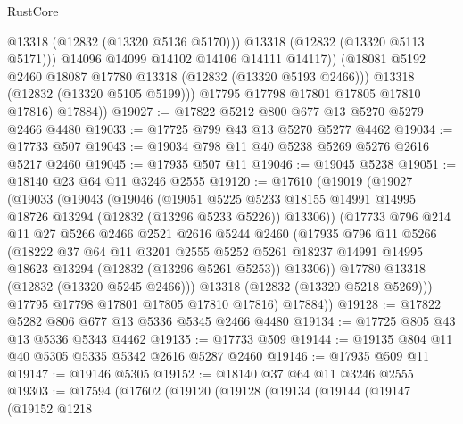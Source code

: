 \begin{lexlean}{RustCore}
\begin{coremodule}
                    @13318
                    (@12832 (@13320 @5136 @5170)))
                  @13318
                  (@12832 (@13320 @5113 @5171)))
                @14096
                @14099
                @14102
                @14106
                @14111
                @14117))
            (@18081 @5192 @2460 @18087 @17780 @13318 (@12832 (@13320 @5193 @2466)))
            @13318
            (@12832 (@13320 @5105 @5199)))
          @17795
          @17798
          @17801
          @17805
          @17810
          @17816)
        @17884))
@19027 := @17822 @5212 @800 @677 @13 @5270 @5279 @2466 @4480
@19033 := @17725 @799 @43 @13 @5270 @5277 @4462
@19034 := @17733 @507
@19043 := @19034 @798 @11 @40 @5238 @5269 @5276 @2616 @5217 @2460
@19045 := @17935 @507 @11
@19046 := @19045 @5238
@19051 := @18140 @23 @64 @11 @3246 @2555
@19120 := @17610
    (@19019
      (@19027
        (@19033
          (@19043
            (@19046
              (@19051
                @5225
                @5233
                @18155
                @14991
                @14995
                @18726
                @13294
                (@12832 (@13296 @5233 @5226))
                @13306))
            (@17733
              @796
              @214
              @11
              @27
              @5266
              @2466
              @2521
              @2616
              @5244
              @2460
              (@17935
                @796
                @11
                @5266
                (@18222
                  @37
                  @64
                  @11
                  @3201
                  @2555
                  @5252
                  @5261
                  @18237
                  @14991
                  @14995
                  @18623
                  @13294
                  (@12832 (@13296 @5261 @5253))
                  @13306))
              @17780
              @13318
              (@12832 (@13320 @5245 @2466)))
            @13318
            (@12832 (@13320 @5218 @5269)))
          @17795
          @17798
          @17801
          @17805
          @17810
          @17816)
        @17884))
@19128 := @17822 @5282 @806 @677 @13 @5336 @5345 @2466 @4480
@19134 := @17725 @805 @43 @13 @5336 @5343 @4462
@19135 := @17733 @509
@19144 := @19135 @804 @11 @40 @5305 @5335 @5342 @2616 @5287 @2460
@19146 := @17935 @509 @11
@19147 := @19146 @5305
@19152 := @18140 @37 @64 @11 @3246 @2555
@19303 := @17594
    (@17602
      (@19120
        (@19128
          (@19134
            (@19144
              (@19147
                (@19152
                  @1218

\end{coremodule}
\end{lexlean}
